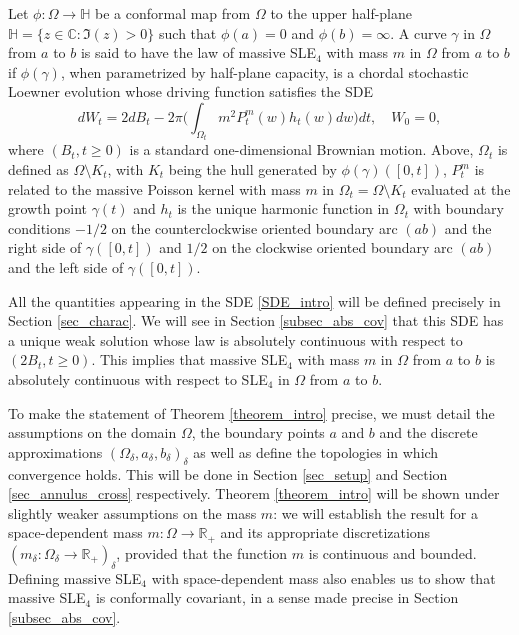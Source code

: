 \documentclass{article}
\newcommand{\HH}{{\mathbb{H}}}
\theoremstyle{definition}
\theoremstyle{remark}
\theoremstyle{remark}
\begin{document}
Let $\phi: \Omega \to \HH$ be a conformal map from $\Omega$ to the upper half-plane $\HH=\{z \in \mathbb{C}: \Im(z) > 0 \}$ such that $\phi(a)=0$ and $\phi(b)=\infty$. A curve $\gamma$ in $\Omega$ from $a$ to $b$ is said to have the law of massive SLE$_4$ with mass $m$ in $\Omega$ from $a$ to $b$ if $\phi(\gamma)$, when parametrized by half-plane capacity, is a chordal stochastic Loewner evolution whose driving function satisfies the SDE
\begin{equation} \label{SDE_intro}
    dW_t = 2dB_t - 2\pi \bigg(\int_{\Omega_t}m^2P_t^m(w)h_t(w)dw\bigg)dt, \quad W_0=0,
\end{equation}
where $(B_t, t \geq 0)$ is a standard one-dimensional Brownian motion. Above, $\Omega_t$ is defined as $\Omega \setminus K_t$, with $K_t$ being the hull generated by $\phi(\gamma)([0,t])$, $P_t^m$ is related to the massive Poisson kernel with mass $m$ in $\Omega_t = \Omega \setminus K_t$ evaluated at the growth point $\gamma(t)$ and $h_t$ is the unique harmonic function in $\Omega_t$ with boundary conditions $-1/2$ on the counterclockwise oriented boundary arc $(ab)$ and the right side of $\gamma([0,t])$ and $1/2$ on the clockwise oriented boundary arc $(ab)$ and the left side of $\gamma([0,t])$. 

All the quantities appearing in the SDE \eqref{SDE_intro} will be defined precisely in Section \ref{sec_charac}. We will see in Section \ref{subsec_abs_cov} that this SDE has a unique weak solution whose law is absolutely continuous with respect to $(2B_t, t \geq 0)$. This implies that massive SLE$_4$ with mass $m$ in $\Omega$ from $a$ to $b$ is absolutely continuous with respect to SLE$_4$ in $\Omega$ from $a$ to $b$.

To make the statement of Theorem \ref{theorem_intro} precise, we must detail the assumptions on the domain $\Omega$, the boundary points $a$ and $b$ and the discrete approximations $(\Omega_{\delta},a_{\delta}, b_{\delta})_{\delta}$ as well as define the topologies in which convergence holds. This will be done in Section \ref{sec_setup} and Section \ref{sec_annulus_cross} respectively. Theorem \ref{theorem_intro} will be shown under slightly weaker assumptions on the mass $m$: we will establish the result for a space-dependent mass $m: \Omega \to \mathbb{R}_{+}$ and its appropriate discretizations $(m_{\delta}: \Omega_{\delta} \to \mathbb{R}_{+})_{\delta}$, provided that the function $m$ is continuous and bounded. Defining massive SLE$_4$ with space-dependent mass also enables us to show that massive SLE$_4$ is conformally covariant, in a sense made precise in Section \ref{subsec_abs_cov}.
\end{document}
